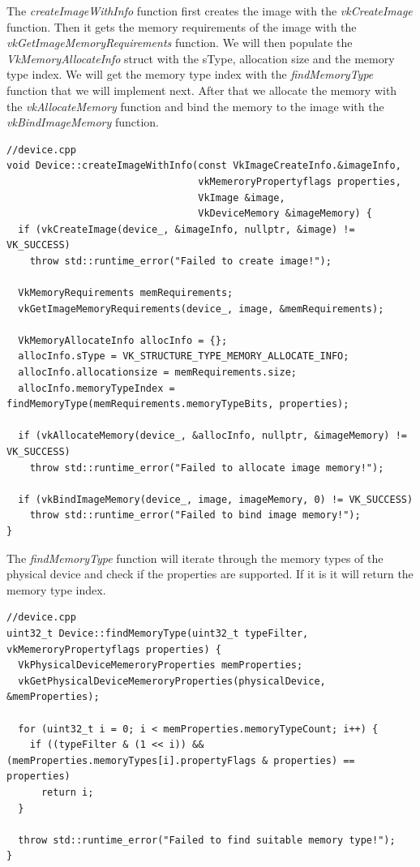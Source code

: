 \documentclass[12pt]{report} \usepackage{preamble}
\begin{document}
The \textit{createImageWithInfo} function first creates the image with the \textit{vkCreateImage} function. Then it
gets the memory requirements of the image with the \textit{vkGetImageMemoryRequirements} function. We will then
populate the \textit{VkMemoryAllocateInfo} struct with the sType, allocation size and the memory type index. We will
get the memory type index with the \textit{findMemoryType} function that we will implement next. After that we
allocate the memory with the \textit{vkAllocateMemory} function and bind the memory to the image with the
\textit{vkBindImageMemory} function.

\begin{lstlisting}[Language=C++]
//device.cpp
void Device::createImageWithInfo(const VkImageCreateInfo.&imageInfo, 
                                 vkMemeroryPropertyflags properties, 
                                 VkImage &image, 
                                 VkDeviceMemory &imageMemory) {
  if (vkCreateImage(device_, &imageInfo, nullptr, &image) != VK_SUCCESS)
    throw std::runtime_error("Failed to create image!");

  VkMemoryRequirements memRequirements;
  vkGetImageMemoryRequirements(device_, image, &memRequirements);

  VkMemoryAllocateInfo allocInfo = {};
  allocInfo.sType = VK_STRUCTURE_TYPE_MEMORY_ALLOCATE_INFO;
  allocInfo.allocationsize = memRequirements.size;
  allocInfo.memoryTypeIndex = findMemoryType(memRequirements.memoryTypeBits, properties);

  if (vkAllocateMemory(device_, &allocInfo, nullptr, &imageMemory) != VK_SUCCESS)
    throw std::runtime_error("Failed to allocate image memory!");

  if (vkBindImageMemory(device_, image, imageMemory, 0) != VK_SUCCESS)
    throw std::runtime_error("Failed to bind image memory!");
}
\end{lstlisting}

The \textit{findMemoryType} function will iterate through the memory types of the physical device and check if the
properties are supported. If it is it will return the memory type index.

\begin{lstlisting}[Language=C++]
//device.cpp
uint32_t Device::findMemoryType(uint32_t typeFilter, vkMemeroryPropertyflags properties) {
  VkPhysicalDeviceMemeroryProperties memProperties;
  vkGetPhysicalDeviceMemeroryProperties(physicalDevice, &memProperties);

  for (uint32_t i = 0; i < memProperties.memoryTypeCount; i++) {
    if ((typeFilter & (1 << i)) && (memProperties.memoryTypes[i].propertyFlags & properties) == properties)
      return i;
  }

  throw std::runtime_error("Failed to find suitable memory type!");
}
\end{lstlisting}
\end{document}
